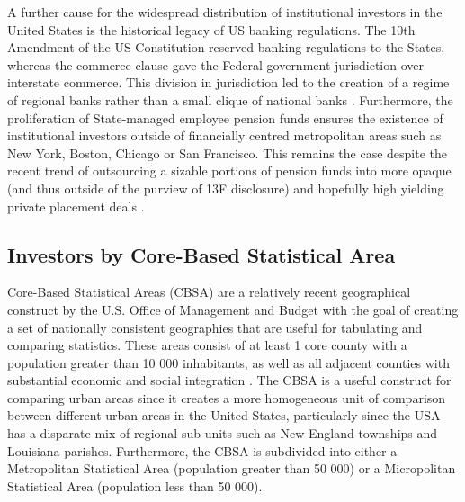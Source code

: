 A further cause for the widespread distribution of institutional investors in the United States is the historical legacy of US banking regulations.  The 10th Amendment of the US Constitution reserved banking regulations to the States, whereas the commerce clause gave the Federal government jurisdiction over interstate commerce.  This division in jurisdiction led to the creation of a regime of regional banks rather than a small clique of national banks \citep{Calomiris2000}. Furthermore, the proliferation of State-managed employee pension funds ensures the existence of institutional investors outside of financially centred metropolitan areas such as New York, Boston, Chicago or San Francisco.  This remains the case despite the recent trend of outsourcing a sizable portions of pension funds into more opaque (and thus outside of the purview of 13F disclosure) and hopefully high yielding private placement deals \cite{lerner2019investing}. 




\subsection{Investors by Core-Based Statistical Area}


Core-Based Statistical Areas (CBSA) are a relatively recent geographical construct by the U.S. Office of Management and Budget with the goal of creating a set of nationally consistent geographies that are useful for tabulating and comparing statistics.  These areas consist of at least 1 core county with a population greater than 10 000 inhabitants, as well as all adjacent counties with substantial economic and social integration \citep{USCensusCBSAdef}.  The CBSA is a useful construct for comparing urban areas since it creates a more homogeneous unit of comparison between different urban areas in the United States, particularly since the USA has a disparate mix of regional sub-units such as New England townships and Louisiana parishes.  Furthermore, the CBSA is subdivided into either a Metropolitan Statistical Area (population greater than 50 000) or a Micropolitan Statistical Area (population less than 50 000).  

